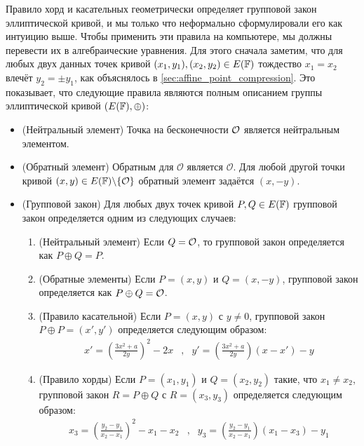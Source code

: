 Правило хорд и касательных геометрически определяет групповой закон эллиптической кривой, и мы только что неформально сформулировали его как интуицию выше. Чтобы применить эти правила на компьютере, мы должны перевести их в алгебраические уравнения. Для этого сначала заметим, что для любых двух данных точек кривой $(x_1,y_1), (x_2,y_2)\in E(\mathbb{F})$ тождество $x_1=x_2$ влечёт $y_2=\pm y_1$, как объяснялось в \secname{} \ref{sec:affine_point_compression}. Это показывает, что следующие правила являются полным описанием группы эллиптической кривой $(E(\mathbb{F}),\oplus)$:

\begin{definition}\label{def:chord-tangent-algebra}
\begin{itemize}
\item (Нейтральный элемент) Точка на бесконечности $\mathcal{O}$ является нейтральным элементом.
\item (Обратный элемент) Обратным для $\mathcal{O}$ является $\mathcal{O}$. Для любой другой точки кривой $(x,y) \in E(\mathbb{F})\backslash \{\mathcal{O}\}$ обратный элемент задаётся $(x,-y)$.
\item (Групповой закон) Для любых двух точек кривой $P, Q \in E(\mathbb{F})$ групповой закон определяется одним из следующих случаев:
\begin{enumerate}
\item (Нейтральный элемент) Если $Q=\mathcal{O}$, то групповой закон определяется как $P\oplus Q=P$.
\item (Обратные элементы) Если $P=(x,y)$ и $Q=(x,-y)$, групповой закон определяется как $P\oplus Q=\mathcal{O}$.
\item (Правило касательной) Если $P=(x,y)$ с $y\neq 0$, групповой закон $P\oplus P=(x',y')$ определяется следующим образом:
$$
\begin{array}{llr}
x' = \left(\frac{3x^2+a}{2y}\right)^2 -2x &,&
y' = \left(\frac{3x^2+a}{2y}\right)\left(x-x'\right) - y
\end{array} 
$$
\item (Правило хорды) Если $P=(x_1,y_1)$ и $Q=(x_2,y_2)$ такие, что $x_1 \neq x_2$, групповой закон $R=P\oplus Q$ с $R=(x_3,y_3)$ определяется следующим образом:
$$
\begin{array}{llr}
x_3 = \left(\frac{y_2-y_1}{x_2-x_1}\right)^2 -x_1-x_2 &, &
y_3 = \left(\frac{y_2-y_1}{x_2-x_1} \right)\left(x_1-x_3\right) - y_1
\end{array} 
$$
\end{enumerate}
\end{itemize}
\end{definition}
